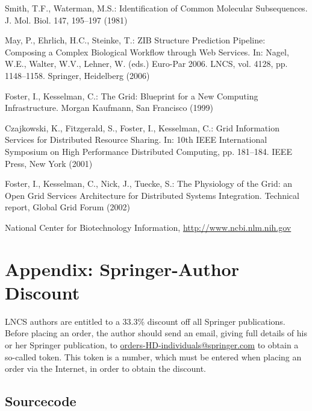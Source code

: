 \documentclass[runningheads,a4paper]{llncs}
\begin{document}
\begin{thebibliography}{4}

 Smith, T.F., Waterman, M.S.: Identification of Common Molecular
Subsequences. J. Mol. Biol. 147, 195--197 (1981)

 May, P., Ehrlich, H.C., Steinke, T.: ZIB Structure Prediction Pipeline:
Composing a Complex Biological Workflow through Web Services. In: Nagel,
W.E., Walter, W.V., Lehner, W. (eds.) Euro-Par 2006. LNCS, vol. 4128,
pp. 1148--1158. Springer, Heidelberg (2006)

 Foster, I., Kesselman, C.: The Grid: Blueprint for a New Computing
Infrastructure. Morgan Kaufmann, San Francisco (1999)

 Czajkowski, K., Fitzgerald, S., Foster, I., Kesselman, C.: Grid
Information Services for Distributed Resource Sharing. In: 10th IEEE
International Symposium on High Performance Distributed Computing, pp.
181--184. IEEE Press, New York (2001)

 Foster, I., Kesselman, C., Nick, J., Tuecke, S.: The Physiology of the
Grid: an Open Grid Services Architecture for Distributed Systems
Integration. Technical report, Global Grid Forum (2002)

 National Center for Biotechnology Information, \url{http://www.ncbi.nlm.nih.gov}

\end{thebibliography}


\section*{Appendix: Springer-Author Discount}

LNCS authors are entitled to a 33.3\% discount off all Springer
publications. Before placing an order, the author should send an email, 
giving full details of his or her Springer publication,
to \url{orders-HD-individuals@springer.com} to obtain a so-called token. This token is a
number, which must be entered when placing an order via the Internet, in
order to obtain the discount.
\subsection*{Sourcecode}
\lstset{numbers=left,
tabsize=2, numbersep=10pt,
  title=\lstname }

\end{document}
